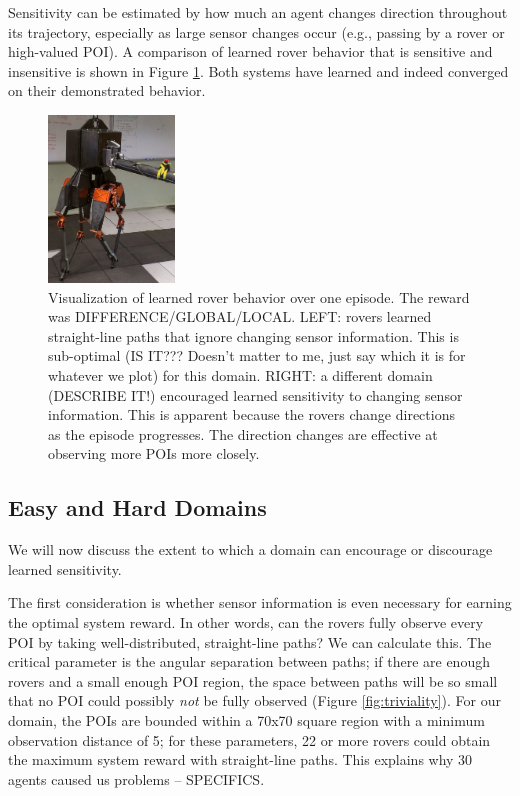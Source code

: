 \documentclass[letterpaper, 10 pt, conference]{ieeeconf}  %
\begin{document}
Sensitivity can be estimated by how much an agent changes direction throughout its trajectory, especially as large sensor changes occur (e.g., passing by a rover or high-valued POI). A comparison of learned rover behavior that is sensitive and insensitive is shown in Figure \ref{fig:sensitivity}. Both systems have learned and indeed converged on their demonstrated behavior. 

\begin{figure}[h!]
    \centering
    \includegraphics[width=0.3\textwidth]{ATRIAS.jpg}
    \caption{Visualization of learned rover behavior over one episode. The reward was DIFFERENCE/GLOBAL/LOCAL. LEFT: rovers learned straight-line paths that ignore changing sensor information. This is sub-optimal (IS IT??? Doesn't matter to me, just say which it is for whatever we plot) for this domain. RIGHT: a different domain (DESCRIBE IT!) encouraged learned sensitivity to changing sensor information. This is apparent because the rovers change directions as the episode progresses. The direction changes are effective at observing more POIs more closely. }
    \label{fig:sensitivity}
\end{figure}


\subsection{Easy and Hard Domains}
We will now discuss the extent to which a domain can encourage or discourage learned sensitivity. 

The first consideration is whether sensor information is even necessary for earning the optimal system reward. In other words, can the rovers fully observe every POI by taking well-distributed, straight-line paths? We can calculate this. The critical parameter is the angular separation between paths; if there are enough rovers and a small enough POI region, the space between paths will be so small that no POI could possibly \emph{not} be fully observed (Figure \ref{fig:triviality}). For our domain, the POIs are bounded within a 70x70 square region with a minimum observation distance of 5; for these parameters, 22 or more rovers could obtain the maximum system reward with straight-line paths. This explains why 30 agents caused us problems -- SPECIFICS.
\end{document}
